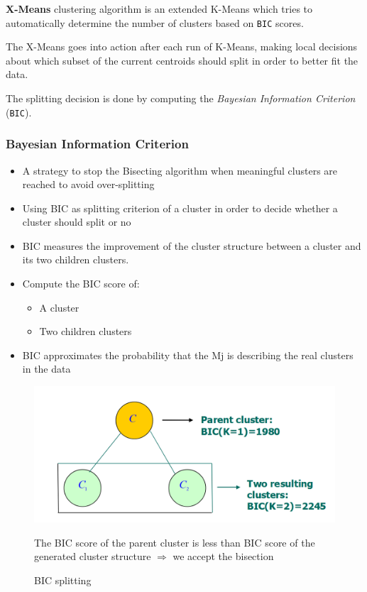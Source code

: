 \textbf{X-Means} clustering algorithm is an extended K-Means which tries to automatically determine the number of clusters based on \texttt{BIC} scores.

The X-Means goes into action after each run of K-Means,
making local decisions about which subset of the
current centroids should split in order to better fit the data.

The splitting decision is done by computing the \textit{Bayesian
Information Criterion} (\texttt{BIC}).

\subsubsection{Bayesian Information Criterion}
\begin{itemize}
	\item A strategy to stop the Bisecting algorithm when meaningful
clusters are reached to avoid over-splitting
	\item Using BIC as splitting criterion of a cluster in order to decide
whether a cluster should split or no
	\item BIC measures the improvement of the cluster structure
between a cluster and its two children clusters.
	\item Compute the BIC score of:
\begin{itemize}
	\item A cluster
	\item Two children clusters
\end{itemize}
	\item BIC approximates the probability that the Mj is describing the
real clusters in the data
\end{itemize}

\begin{figure}[htbp]
   \centering
   \includegraphics{images/07/BICsplitting.png}
   \caption{BIC splitting}
   \label{fig:07/bicsplitting}
   The BIC score of the parent cluster is less than BIC score of the generated cluster structure $\Rightarrow$ we accept the bisection
\end{figure}

